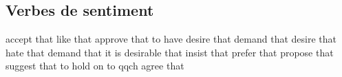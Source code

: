\subsection*{Verbes de sentiment}
   {accept that}
   {like that}
   {approve that}
   {to have desire that}
   {demand that}
   {desire that}
   {hate that}
   {demand that}
   {it is desirable that}
   {insist that}
   {prefer that}
   {propose that}
   {suggest that}
   {to hold on to qqch}
   {agree that}
